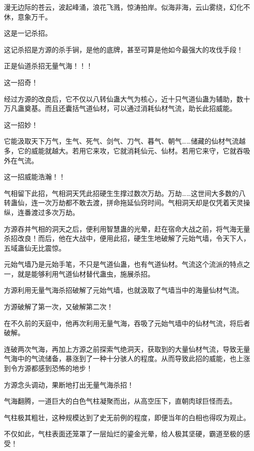 
\begin{this_body}

漫无边际的苍云，波起峰涌，浪花飞溅，惊涛拍岸。似海非海，云山雾绕，幻化不休，意象万千。

这是一记杀招。

这记杀招是方源的杀手锏，是他的底牌，甚至可算是他如今最强大的攻伐手段！

正是仙道杀招无量气海！！！

这一招奇！

经过方源的改良后，它不仅以八转仙蛊大气为核心，近十只气道仙蛊为辅助，数十万凡蛊奠基。而且还囊括气道仙材，可以通过消耗仙材气流，助长此招威能。

这一招妙！

它能汲取天下万气，生气、死气、剑气、刀气、暮气、朝气……储藏的仙材气流越多，它的威能就越大。若用它来攻，它就消耗仙元、仙材。若用它来守，它就吞吸外在气流。

这一招威能浩瀚！！

气相留下此招，气相洞天凭此招硬生生撑过数次万劫。万劫……这世间大多数的八转蛊仙，连一次万劫都不敢去渡，拼命拖延仙窍时间。气相洞天却是仅凭着天灵操纵，连番渡过多次万劫。

方源吞并气相的洞天之后，便利用智慧蛊的光晕，赶在宿命大战之前，将气海无量杀招改良！而后，他在大战中，便用此招，硬生生地破解了元始气墙，令天下人，五域蛊仙无比震惊。

元始气墙乃是元始手笔，不只是气道仙蛊，也有气道仙材。气流这个流派的特点之一，就是能够利用气道仙材替代蛊虫，施展杀招。

方源利用无量气海杀招破解了元始气墙，也就汲取了气墙当中的海量仙材气流。

方源破解了第一次，又破解第二次！

在不久前的天庭中，他再次利用无量气海，吞吸了元始气墙中的仙材气流，将后者破解。

连破两次气海，再加上方源之前探索气绝洞天，获取到的大量仙材气流，导致无量气海中的气流储备，暴涨到了一种十分骇人的程度。从而导致此招的威能，也上涨到令方源都感到恐怖的地步！

方源念头调动，果断地打出无量气海杀招！

气海翻腾，一道巨大的白色气柱凝聚而出，从高空压下，直朝肉球巨怪而去。

气柱极其粗壮，这种规模达到了史无前例的程度，即便当年的白相也得叹为观止。

不仅如此，气柱表面还笼罩了一层灿烂的鎏金光晕，给人极其坚硬，霸道至极的感受！


\end{this_body}
